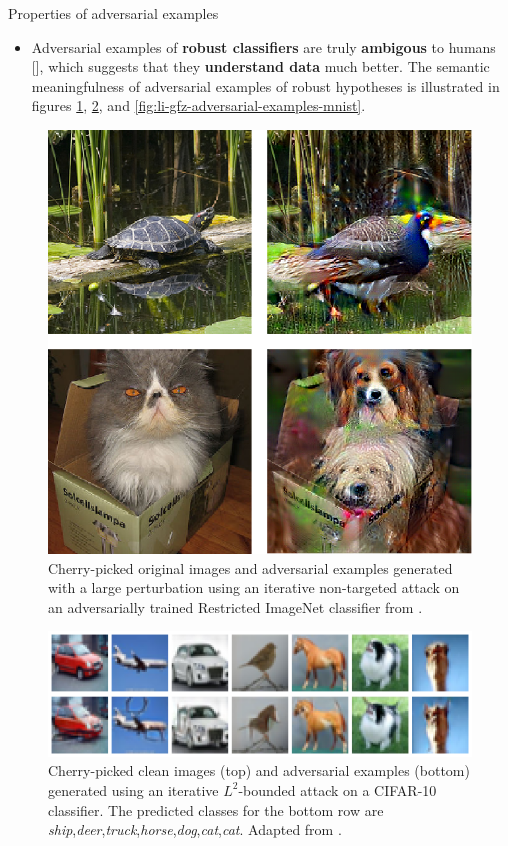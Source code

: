 \documentclass{beamer}
\newcommand{\citet}[1]{{\color{citecolor}\relscale{0.8}\textcite{#1}}}
\newcommand{\citep}[1]{{\color{citecolor}\relscale{0.8}[\textcite{#1}]}}
\begin{document}
\begin{frame}[allowframebreaks=0.9]{Properties of adversarial examples}
\begin{itemize}
    \item Adversarial examples of \textbf{robust classifiers} are truly \textbf{ambigous} to humans \citep{Tsipras:2018:RMBOA,Li:2019:AGCMRAA}, which suggests that they \textbf{understand data} much better. The semantic meaningfulness of adversarial examples of robust hypotheses is illustrated in figures \ref{fig:tsipras-robust-adversarial-examples}, \ref{fig:rony-cifar10-cherry-picked}, and \ref{fig:li-gfz-adversarial-examples-mnist}.
\end{itemize}
\begin{figure}
	\begin{center}
		\includegraphics[width=0.5\columnwidth]{figures/adversarial-examples/tsipras-turtle-bird-cat-dogs}
	\end{center}
	\caption{Cherry-picked original images and adversarial examples generated with a large perturbation using an iterative non-targeted attack on an adversarially trained Restricted ImageNet classifier from \citet{Tsipras:2018:RMBOA}.}
	\label{fig:tsipras-robust-adversarial-examples}
\end{figure}

\begin{figure}
	\begin{center}
		\includegraphics[width=\textwidth]{figures/adversarial-examples/rony/cifar10_cherry_picked}
	\end{center}
	\caption{Cherry-picked clean images (top) and adversarial examples (bottom) generated using an iterative $L^2$-bounded attack on a CIFAR-10 classifier. The predicted classes for the bottom row are \textit{ship},\textit{deer},\textit{truck},\textit{horse},\textit{dog},\textit{cat},\textit{cat}. Adapted from \cite{Rony:2018:DDNEGBLAAD}.}
	\label{fig:rony-cifar10-cherry-picked}
\end{figure}


\end{frame}
\end{document}
